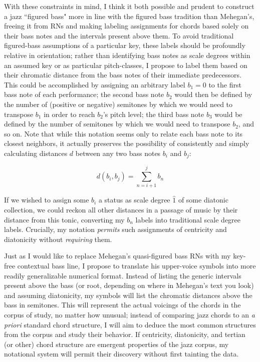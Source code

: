 With these constraints in mind, I think it both possible and prudent to construct a jazz ``figured bass" more in line with the figured bass tradition than Mehegan's, freeing it from RNs and making labeling assignments for chords based solely on their bass notes and the intervals present above them.  To avoid traditional figured-bass assumptions of a particular key, these labels should be profoundly relative in orientation; rather than identifying bass notes as scale degrees within an assumed key or as particular pitch-classes, I propose to label them based on their chromatic distance from the bass notes of their immediate predecessors.  This could be accomplished by assigning an arbitrary label $b_1 = 0$ to the first bass note of each performance; the second bass note $b_2$ would then be defined by the number of (positive or negative) semitones by which we would need to transpose $b_1$ in order to reach $b_2$'s pitch level; the third bass note $b_3$ would be defined by the number of semitones by which we would need to transpose $b_2$, and so on.  Note that while this notation seems only to relate each bass note to its closest neighbors, it actually preserves the possibility of consistently and simply calculating distances $d$ between any two bass notes $b_i$ and $b_j$:

\begin{equation*}
d(b_{i},b_{j}) = \sum_{n=i+1}^{j} b_n
\end{equation*}

If we wished to assign some $b_i$ a status as scale degree $\hat{1}$ of some diatonic collection, we could reckon all other distances in a passage of music by their distance from this tonic, converting my $b_n$ labels into traditional scale degree labels.  Crucially, my notation \emph{permits} such assignments of centricity and diatonicity without \emph{requiring} them.

Just as I would like to replace Mehegan's quasi-figured bass RNs with my key-free contextual bass line, I propose to translate his upper-voice symbols into more readily generalizable numerical format.  Instead of listing the generic intervals present above the bass (or root, depending on where in Mehegan's text you look) and assuming diatonicity, my symbols will list the chromatic distances above the bass in semitones.  This will represent the actual voicings of the chords in the corpus of study, no matter how unusual; instead of comparing jazz chords to an \emph{a priori} standard chord structure, I will aim to deduce the most common structures from the corpus and study their behavior.  If centricity, diatonicity, and tertian (or other) chord structure are emergent properties of the jazz corpus, my notational system will permit their discovery without first tainting the data.


